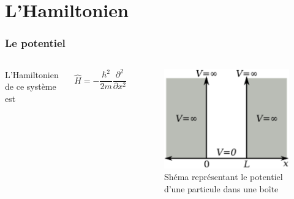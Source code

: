\documentclass[aspectratio=169]{beamer}
\begin{document}
\section{L'Hamiltonien}
\begin{frame}
\frametitle{Le potentiel}

\begin{columns}
L'Hamiltonien de ce système est

\begin{equation}\tag{3}
\hat{H}=-\frac{\hbar^2}{2m}\frac{\partial^2}{\partial x^2}
\end{equation} 

\begin{figure}
\includegraphics[scale=0.4]{Pot}
\caption{Shéma représentant le potentiel d'une particule dans une boîte}
\end{figure}
\end{columns}

\end{frame}
\end{document}
